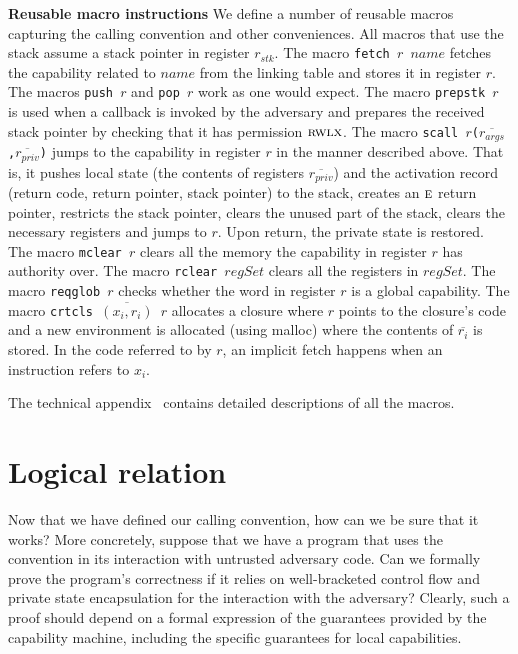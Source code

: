 \documentclass[acmsmall,review]{acmart}\settopmatter{printfolios=true}
\newcommand{\var}[1]{\mathit{#1}}
\newcommand{\stk}{\var{stk}}
\newcommand{\plainperm}[1]{\textsc{#1}}
\newcommand{\entry}{\plainperm{e}}
\newcommand{\rwlx}{\plainperm{rwlx}}
\begin{document}
\textbf{Reusable macro instructions} We define a number of reusable
macros capturing the calling convention and other conveniences. All
macros that use the stack assume a stack pointer in register
$r_\stk$. The macro \texttt{\footnotesize{fetch $r$ $\var{name}$}} fetches the
capability related to $\var{name}$ from the linking table and stores
it in register $r$.  The macros \texttt{\footnotesize{push $r$}} and
\texttt{\footnotesize{pop $r$}} work as one would
expect. The macro \texttt{\footnotesize{prepstk $r$}} is used when a callback is
invoked by the adversary and prepares the received stack pointer by
checking that it has permission $\rwlx$.  The macro \texttt{\footnotesize{scall
    $r$($\overline{r_{\var{args}}}$,$\overline{r_{\var{priv}}}$)}}
jumps to the capability in register $r$ in the manner described
above. That is, it pushes local state (the contents of registers
$\overline{r_{\var{priv}}}$) and the activation record (return code,
return pointer, stack pointer) to the stack, creates an $\entry$
return pointer, restricts the stack pointer, clears the unused part of
the stack, clears the necessary registers and jumps to $r$.  Upon
return, the private state is restored. The macro \texttt{\footnotesize{mclear
    $r$}} clears all the memory the capability in register $r$ has
authority over.  The macro \texttt{\footnotesize{rclear $\var{regSet}$}} clears
all the registers in $\var{regSet}$. The macro \texttt{\footnotesize{reqglob
    $r$}} checks whether the word in register $r$ is a global
capability. The macro \texttt{\footnotesize{crtcls $\overline{(x_i,r_i)}$ $r$}}
allocates a closure where $r$ points to the closure's code and a new
environment is allocated (using malloc) where the contents of
$\overline{r_i}$ is stored. In the code referred to by $r$, an
implicit fetch happens when an instruction refers to $x_i$.

The technical appendix~\citep{technical_appendix} contains detailed descriptions
of all the macros.

\section{Logical relation}
\label{sec:logical-relation}
Now that we have defined our calling convention, how can we be sure that it
works? More concretely, suppose that we have a program that uses the convention
in its interaction with untrusted adversary code. Can we formally prove the
program's correctness if it relies on well-bracketed control flow and private
state encapsulation for the interaction with the adversary? Clearly, such a
proof should depend on a formal expression of the guarantees provided by the
capability machine, including the specific guarantees for local capabilities.
\end{document}
